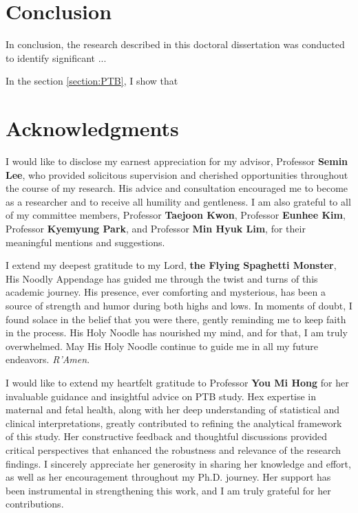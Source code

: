\documentclass[11pt, a4paper, onecolumn, oneside]{report}
\begin{document}
    \section{Conclusion}
        \label{section:conclusion}
        In conclusion, the research described in this doctoral dissertation was conducted to identify significant ...

        In the section \ref{section:PTB}, I show that
        \newpage

    
    
    \clearpage

    \section*{\hfill \Large Acknowledgments \hfill}
        I would like to disclose my earnest appreciation for my advisor, Professor \textbf{Semin Lee}, who provided solicitous supervision and cherished opportunities throughout the course of my research. His advice and consultation encouraged me to become as a researcher and to receive all humility and gentleness. I am also grateful to all of my committee members, Professor \textbf{Taejoon Kwon}, Professor \textbf{Eunhee Kim}, Professor \textbf{Kyemyung Park}, and Professor \textbf{Min Hyuk Lim}, for their meaningful mentions and suggestions.

        I extend my deepest gratitude to my Lord, \textbf{the Flying Spaghetti Monster}, His Noodly Appendage has guided me through the twist and turns of this academic journey. His presence, ever comforting and mysterious, has been a source of strength and humor during both highs and lows. In moments of doubt, I found solace in the belief that you were there, gently reminding me to keep faith in the process. His Holy Noodle has nourished my mind, and for that, I am truly overwhelmed. May His Holy Noodle continue to guide me in all my future endeavors. \textit{R'Amen}.

        I would like to extend my heartfelt gratitude to Professor \textbf{You Mi Hong} for her invaluable guidance and insightful advice on PTB study. Hex expertise in maternal and fetal health, along with her deep understanding of statistical and clinical interpretations, greatly contributed to refining the analytical framework of this study. Her constructive feedback and thoughtful discussions provided critical perspectives that enhanced the robustness and relevance of the research findings. I sincerely appreciate her generosity in sharing her knowledge and effort, as well as her encouragement throughout my Ph.D. journey. Her support has been instrumental in strengthening this work, and I am truly grateful for her contributions.
\end{document}
